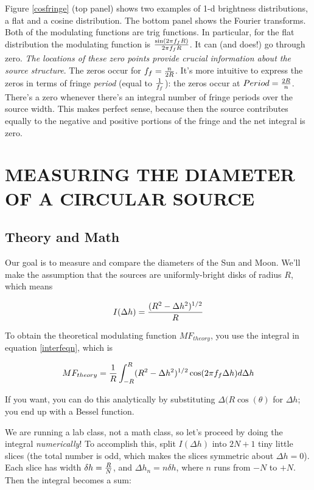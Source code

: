 \documentclass[11pt,preprint]{aastex}
\begin{document}
Figure \ref{cosfringe} (top panel) shows two examples of 1-d brightness
distributions, a flat and a cosine distribution.  The bottom panel shows
the Fourier transforms.  Both of the modulating functions are trig
functions. In particular, for the flat distribution the modulating
function is ${ \sin(2 \pi f_f R) \over 2 \pi f_f R}$. It can (and does!)
go through zero. {\it The locations of these zero points provide crucial
information about the source structure}. The zeros occur for $f_f={n
\over 2R}$. It's more intuitive to express the zeros in terms of fringe
{\it period} (equal to $1 \over f_f$): the zeros occur at $Period = {2R
\over n}$. There's a zero whenever there's an integral number of fringe
periods over the source width. This makes perfect sense, because then
the source contributes equally to the negative and positive portions of
the fringe and the net integral is zero.


\section{MEASURING THE DIAMETER OF A CIRCULAR SOURCE}

\subsection{Theory and Math}
Our goal is to measure and compare the diameters of the Sun and
Moon. We'll make the assumption that the sources are uniformly-bright
disks of radius $R$, which means

\begin{equation}
I(\Delta h) = { (R^2 - \Delta h^2)^{1/2} \over  R}
\end{equation}

\noindent To obtain the theoretical modulating function $MF_{theory}$, you use the integral in
equation \ref{interfeqn}, which is

\begin{equation}
MF_{theory} = {1 \over R} \int_{-R}^R (R^2 - \Delta h^2)^{1/2} 
	\cos(2\pi f_f \Delta h) d \Delta h
\end{equation}

\noindent If you want, you can do this analytically by substituting
$\Delta (R \cos (\theta)$ for $\Delta h$; you end up with a Bessel
function.

We are running a lab class, not a math class, so let's proceed by doing
the integral {\it numerically}! To accomplish this, split $I(\Delta h)$
into $2N + 1$ tiny little slices (the total number is odd, which makes
the slices symmetric about $\Delta h = 0$). Each slice has width $\delta
h = {R \over N}$, and $\Delta h_n = n \delta h$, where $n$ runs from
$-N$ to $+N$. Then the integral becomes a sum:
\end{document}
